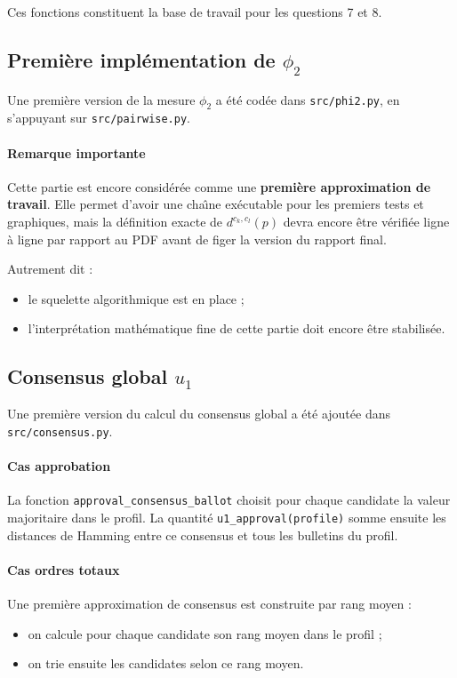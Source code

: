 \documentclass[11pt,a4paper]{article}
\begin{document}
Ces fonctions constituent la base de travail pour les questions 7 et 8.

\subsection{Premi\`ere impl\'ementation de \texorpdfstring{$\phi_2$}{phi2}}

Une premi\`ere version de la mesure \(\phi_2\) a \'et\'e cod\'ee dans \texttt{src/phi2.py}, en s'appuyant sur \texttt{src/pairwise.py}.

\paragraph{Remarque importante}
Cette partie est encore consid\'er\'ee comme une \textbf{premi\`ere approximation de travail}. Elle permet d'avoir une cha\^\i ne ex\'ecutable pour les premiers tests et graphiques, mais la d\'efinition exacte de \(d^{c_k,c_l}(p)\) devra encore \^etre v\'erifi\'ee ligne \`a ligne par rapport au PDF avant de figer la version du rapport final.

Autrement dit :
\begin{itemize}[leftmargin=*]
    \item le squelette algorithmique est en place ;
    \item l'interpr\'etation math\'ematique fine de cette partie doit encore \^etre stabilis\'ee.
\end{itemize}

\subsection{Consensus global \texorpdfstring{$u_1$}{u1}}

Une premi\`ere version du calcul du consensus global a \'et\'e ajout\'ee dans \texttt{src/consensus.py}.

\paragraph{Cas approbation}
La fonction \texttt{approval\_consensus\_ballot} choisit pour chaque candidate la valeur majoritaire dans le profil. La quantit\'e \texttt{u1\_approval(profile)} somme ensuite les distances de Hamming entre ce consensus et tous les bulletins du profil.

\paragraph{Cas ordres totaux}
Une premi\`ere approximation de consensus est construite par rang moyen :
\begin{itemize}[leftmargin=*]
    \item on calcule pour chaque candidate son rang moyen dans le profil ;
    \item on trie ensuite les candidates selon ce rang moyen.
\end{itemize}
\end{document}

